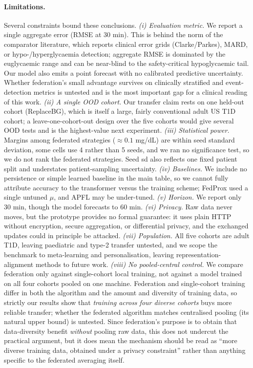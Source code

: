 \documentclass[10pt,letterpaper]{article}
\begin{document}
\paragraph{Limitations.} Several constraints bound these conclusions. \emph{(i)
Evaluation metric.} We report a single aggregate error (RMSE at 30 min). This is
behind the norm of the comparator literature, which reports clinical error grids
(Clarke/Parkes), MARD, or hypo-/hyperglycaemia detection; aggregate RMSE is
dominated by the euglycaemic range and can be near-blind to the safety-critical
hypoglycaemic tail. Our model also emits a point forecast with no calibrated
predictive uncertainty. Whether federation's small advantage survives on
clinically stratified and event-detection metrics is untested and is the most
important gap for a clinical reading of this work. \emph{(ii) A single OOD cohort.}
Our transfer claim rests on one held-out cohort (ReplaceBG), which is itself a
large, fairly conventional adult US T1D cohort; a leave-one-cohort-out design
over the five cohorts would give several OOD tests and is the highest-value next
experiment. \emph{(iii) Statistical power.} Margins among federated strategies
($\approx 0.1$ mg/dL) are within seed standard deviation, some cells use 4 rather
than 5 seeds, and we ran no significance test, so we do not rank the federated
strategies. Seed sd also reflects one fixed patient split and understates
patient-sampling uncertainty. \emph{(iv) Baselines.} We include no persistence or
simple learned baseline in the main table, so we cannot fully attribute accuracy
to the transformer versus the training scheme; FedProx used a single untuned
$\mu$, and APFL may be under-tuned. \emph{(v) Horizon.} We report only 30 min,
though the model forecasts to 60 min. \emph{(vi) Privacy.} Raw data never moves,
but the prototype provides no formal guarantee: it uses plain HTTP without
encryption, secure aggregation, or differential privacy, and the exchanged
updates could in principle be attacked. \emph{(vii) Population.} All five cohorts
are adult T1D, leaving paediatric and type-2 transfer untested, and we scope the
benchmark to meta-learning and personalisation, leaving representation-alignment
methods to future work. \emph{(viii) No pooled-central control.} We compare
federation only against single-cohort local training, not against a model trained
on all four cohorts pooled on one machine. Federation and single-cohort training
differ in both the algorithm and the amount and diversity of training data, so
strictly our results show that \emph{training across four diverse cohorts} buys
more reliable transfer; whether the federated algorithm matches centralised
pooling (its natural upper bound) is untested. Since federation's purpose is to
obtain that data-diversity benefit \emph{without} pooling raw data, this does not
undercut the practical argument, but it does mean the mechanism should be read as
``more diverse training data, obtained under a privacy constraint'' rather than
anything specific to the federated averaging itself.
\end{document}
